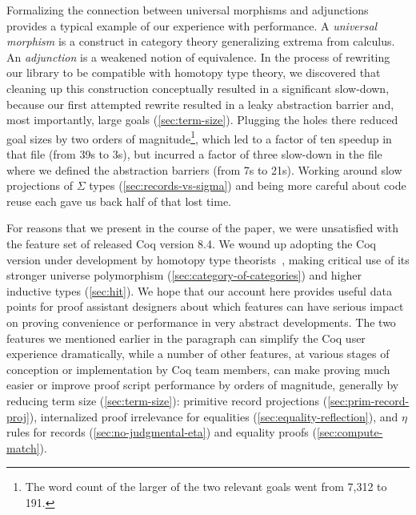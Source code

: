 \documentclass[runningheads]{llncs}
\begin{document}
Formalizing the connection between universal morphisms and adjunctions provides a typical example of our experience with performance.  A \emph{universal morphism} is a construct in category theory generalizing extrema from calculus.  An \emph{adjunction} is a weakened notion of equivalence.  In the process of rewriting our library to be compatible with homotopy type theory, we discovered that cleaning up this construction conceptually resulted in a significant slow-down, because our first attempted rewrite resulted in a leaky abstraction barrier and, most importantly, large goals (\autoref{sec:term-size}).  Plugging the holes there reduced goal sizes by two orders of magnitude\footnote{The word count of the larger of the two relevant goals went from 7,312 to 191.}, which led to a factor of ten speedup in that file (from 39s to 3s), but incurred a factor of three slow-down in the file where we defined the abstraction barriers (from 7s to 21s).  Working around slow projections of $\Sigma$ types (\autoref{sec:records-vs-sigma}) and being more careful about code reuse each gave us back half of that lost time.

For reasons that we present in the course of the paper, we were unsatisfied with the feature set of released Coq version 8.4.  We wound up adopting the Coq version under development by homotopy type theorists~\cite{HoTT/coq}, making critical use of its stronger universe polymorphism (\autoref{sec:category-of-categories}) and higher inductive types (\autoref{sec:hit}).  We hope that our account here provides useful data points for proof assistant designers about which features can have serious impact on proving convenience or performance in very abstract developments.  The two features we mentioned earlier in the paragraph can simplify the Coq user experience dramatically, while a number of other features, at various stages of conception or implementation by Coq team members, can make proving much easier or improve proof script performance by orders of magnitude, generally by reducing term size (\autoref{sec:term-size}): primitive record projections (\autoref{sec:prim-record-proj}), internalized proof irrelevance for equalities (\autoref{sec:equality-reflection}), and $\eta$ rules for records (\autoref{sec:no-judgmental-eta}) and equality proofs (\autoref{sec:compute-match}).
\end{document}
